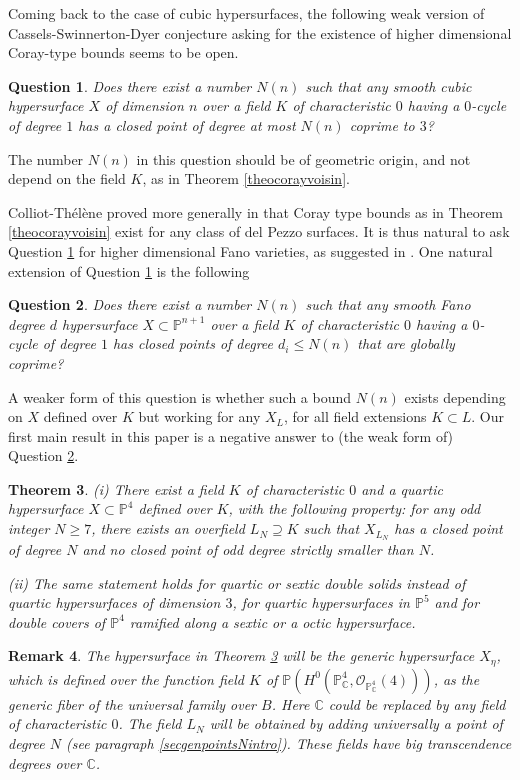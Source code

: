 \documentclass[10pt]{article}
\newtheorem{theo}{Theorem}[section]
\newtheorem{rema}[theo]{Remark}
\newtheorem{question}[theo]{Question}
\begin{document}
Coming back to the case of cubic hypersurfaces, the following weak version of Cassels-Swinnerton-Dyer conjecture asking  for the existence of higher dimensional Coray-type bounds seems to be open.
\begin{question} \label{questioncoary} Does there exist a number $N(n)$ such that any   smooth cubic hypersurface $X$ of dimension $n$ over a field $K$ of characteristic $0$ having a $0$-cycle of degree $1$ has  a  closed point of degree at most  $ N(n)$ coprime to $3$?
\end{question}
The number $N(n)$ in this question should be of geometric origin, and not depend on the field  $K$, as in Theorem \ref{theocorayvoisin}.

 Colliot-Th\'{e}l\`{e}ne proved more generally in \cite{colliot} that  Coray type bounds as in Theorem \ref{theocorayvoisin} exist for any class of del Pezzo surfaces. It is thus  natural to ask   Question \ref{questioncoary} for higher dimensional  Fano varieties, as suggested in \cite{colliot}.  One  natural extension of Question \ref{questioncoary} is the following
\begin{question} \label{questioncoaryhighdeg} Does there exist a number $N(n)$ such that any   smooth Fano degree $d$ hypersurface $X\subset \mathbb{P}^{n+1}$ over a field $K$ of characteristic $0$ having  a $0$-cycle of degree $1$ has   closed points   of degree $d_i\leq N(n)$ that are globally coprime?
\end{question}
A weaker form of this  question is whether such a bound $N(n)$ exists depending on $X$ defined over $K$ but  working for any $X_L$, for all field extensions $K\subset L$.
Our first main result in this paper is a negative answer to (the weak form of) Question \ref{questioncoaryhighdeg}.
\begin{theo}\label{theovrai} (i)  There  exist  a field $K$ of characteristic $0$ and a quartic hypersurface $X\subset \mathbb{P}^4$ defined over $K$, with the following property: for any odd integer $N\geq7$, there exists an overfield $ L_N\supseteq K$ such that $X_{L_N}$ has  a closed point of degree $N$ and no closed point of odd degree strictly smaller than $N$.

(ii) The same statement holds for quartic or sextic  double solids instead of quartic hypersurfaces of  dimension $3$, for quartic hypersurfaces in $\mathbb{P}^5$ and for double covers of $\mathbb{P}^4$ ramified along a sextic or a octic hypersurface.
\end{theo}

 \begin{rema}\label{remastrongertheo} {\rm   The hypersurface in Theorem \ref{theovrai} will be the generic  hypersurface $X_{\eta}$, which is defined over the function  field $K$ of $\mathbb{P}(H^0(\mathbb{P}^4_\mathbb{C},\mathcal{O}_{\mathbb{P}^4_\mathbb{C}}(4)))$, as the generic fiber of the universal family over $B$. Here $\mathbb{C}$ could be replaced by any field of characteristic $0$. The field $L_N$  will be obtained by adding universally a point of degree $N$ (see paragraph \ref{secgenpointsNintro}). These fields have big transcendence degrees over $\mathbb{C}$.  }
 \end{rema}
\end{document}
